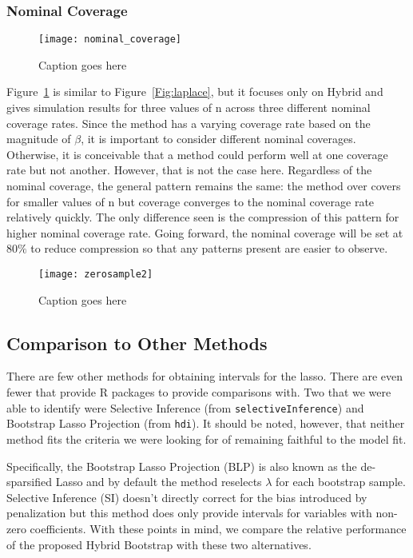 \subsubsection{Nominal Coverage}

\begin{figure}
  \texttt{[image: nominal\_coverage]}
  \caption{\label{Fig:nominal_coverage} Caption goes here}
\end{figure}

Figure~\ref{Fig:nominal_coverage} is similar to Figure~\ref{Fig:laplace}, but it focuses only on Hybrid and gives simulation results for three values of n across three different nominal coverage rates. Since the method has a varying coverage rate based on the magnitude of $\beta$, it is important to consider different nominal coverages. Otherwise, it is conceivable that a method could perform well at one coverage rate but not another. However, that is not the case here. Regardless of the nominal coverage, the general pattern remains the same: the method over covers for smaller values of n but coverage converges to the nominal coverage rate relatively quickly. The only difference seen is the compression of this pattern for higher nominal coverage rate. Going forward, the nominal coverage will be set at $80\%$ to reduce compression so that any patterns present are easier to observe.

\begin{figure}
  \texttt{[image: zerosample2]}
  \caption{\label{Fig:zerosample2} Caption goes here}
\end{figure}

\subsection{Comparison to Other Methods}

There are few other methods for obtaining intervals for the lasso. There are even fewer that provide R packages to provide comparisons with. Two that we were able to identify were Selective Inference (from \texttt{selectiveInference}) and Bootstrap Lasso Projection (from \texttt{hdi}). It should be noted, however, that neither method fits the criteria we were looking for of remaining faithful to the model fit.

Specifically, the Bootstrap Lasso Projection (BLP) is also known as the de-sparsified Lasso and by default the method reselects $\lambda$ for each bootstrap sample. Selective Inference (SI) doesn't directly correct for the bias introduced by penalization but this method does only provide intervals for variables with non-zero coefficients. With these points in mind, we compare the relative performance of the proposed Hybrid Bootstrap with these two alternatives.

